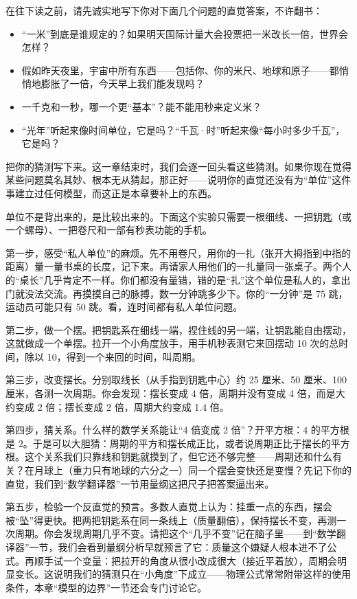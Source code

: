 
在往下读之前，请先诚实地写下你对下面几个问题的直觉答案，不许翻书：

\begin{itemize}[leftmargin=1.8em]
  \item “一米”到底是谁规定的？如果明天国际计量大会投票把一米改长一倍，世界会怎样？
  \item 假如昨天夜里，宇宙中所有东西——包括你、你的米尺、地球和原子——都悄悄地膨胀了一倍，今天早上我们能发现吗？
  \item 一千克和一秒，哪一个更“基本”？能不能用秒来定义米？
  \item “光年”听起来像时间单位，它是吗？“千瓦·时”听起来像“每小时多少千瓦”，它是吗？
\end{itemize}

把你的猜测写下来。这一章结束时，我们会逐一回头看这些猜测。如果你现在觉得某些问题莫名其妙、根本无从猜起，那正好——说明你的直觉还没有为“单位”这件事建立过任何模型，而这正是本章要补上的东西。


单位不是背出来的，是比较出来的。下面这个实验只需要一根细线、一把钥匙（或一个螺母）、一把卷尺和一部有秒表功能的手机。

\begin{experiment}[一把钥匙测出时间的语法]
第一步，感受“私人单位”的麻烦。先不用卷尺，用你的一扎（张开大拇指到中指的距离）量一量书桌的长度，记下来。再请家人用他们的一扎量同一张桌子。两个人的“桌长”几乎肯定不一样。你们都没有量错，错的是“扎”这个单位是私人的，拿出门就没法交流。再摸摸自己的脉搏，数一分钟跳多少下。你的“一分钟”是 75 跳，运动员可能只有 50 跳。看，连时间都有私人单位问题。

第二步，做一个摆。把钥匙系在细线一端，捏住线的另一端，让钥匙能自由摆动，这就做成一个单摆。拉开一个小角度放手，用手机秒表测它来回摆动 10 次的总时间，除以 10，得到一个来回的时间，叫周期。

第三步，改变摆长。分别取线长（从手指到钥匙中心）约 25 厘米、50 厘米、100 厘米，各测一次周期。你会发现：摆长变成 4 倍，周期并没有变成 4 倍，而是大约变成 2 倍；摆长变成 2 倍，周期大约变成 1.4 倍。

第四步，猜关系。什么样的数学关系能让“4 倍变成 2 倍”？开平方根：$4$ 的平方根是 $2$。于是可以大胆猜：周期的平方和摆长成正比，或者说周期正比于摆长的平方根。这个关系我们只靠线和钥匙就摸到了，但它还不够完整——周期还和什么有关？在月球上（重力只有地球的六分之一）同一个摆会变快还是变慢？先记下你的直觉，我们到“数学翻译器”一节用量纲这把尺子把答案逼出来。

第五步，检验一个反直觉的预言。多数人直觉上认为：挂重一点的东西，摆会被“坠”得更快。把两把钥匙系在同一条线上（质量翻倍），保持摆长不变，再测一次周期。你会发现周期几乎不变。请把这个“几乎不变”记在脑子里——到“数学翻译器”一节，我们会看到量纲分析早就预言了它：质量这个嫌疑人根本进不了公式。再顺手试一个变量：把拉开的角度从很小改成很大（接近平着放），周期会明显变长。这说明我们的猜测只在“小角度”下成立——物理公式常常附带这样的使用条件，本章“模型的边界”一节还会专门讨论它。
\end{experiment}

